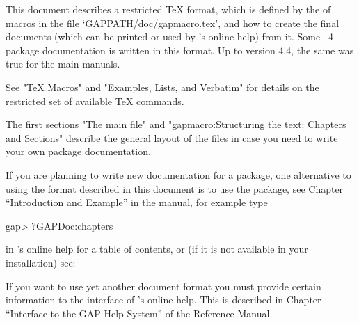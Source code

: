
\TableOfContents
\FrontMatter

\Chapters


This document describes a restricted {\TeX} format,
which is defined by the of macros in the file `GAPPATH/doc/gapmacro.tex',
and how to create the final documents (which can be printed or used by
{\GAP}'s online help) from it.
Some {\GAP}~4 package documentation is written in this format.
Up to version 4.4, the same was true for the main {\GAP} manuals.

See "TeX Macros" and "Examples, Lists, and Verbatim" for details  on  the
restricted set of available {\TeX} commands.

The first sections "The main file" and
"gapmacro:Structuring the text: Chapters and Sections" describe
the  general  layout of the  files  in case  you need to   write your own
package documentation.

If you are planning to write new documentation for a {\GAP} package,
one alternative to using the format described in this document 
is to use the  package,
see Chapter ``Introduction and Example''
in the  manual,
for example type

\beginexample
gap> ?GAPDoc:chapters
\endexample

in {\GAP}'s online help for a  table  of  contents,  or  (if  it  is  not
available in your installation) see:

If you want to use yet another document format you must  provide  certain
information to the interface of {\GAP}'s online help. This  is  described
in Chapter ``Interface to the GAP Help System'' of the
{\GAP} Reference Manual.

